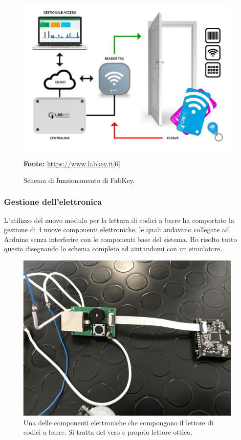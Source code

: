 \begin{figure}[H]
	\begin{center}
	\includegraphics[scale=0.4]{immagini/schema_labkey.jpg}
	\caption{Schema di funzionamento di FabKey.}
	\small{\textbf{Fonte:} \url{https://www.labkey.it}[6]}
	\end{center}
\end{figure}

\subsubsection{Gestione dell'elettronica}
L'utilizzo del nuovo modulo per la lettura di codici a barre ha comportato la gestione di 4 nuove componenti elettroniche, le quali andavano collegate ad Arduino senza interferire con le componenti base del sistema.
Ho risolto tutto questo disegnando lo schema completo ed aiutandomi con un simulatore.

\begin{figure}[H]
	\begin{center}
	\includegraphics[scale=0.065]{immagini/lettore_barcode.jpg}
	\caption{Una delle componenti elettroniche che compongono il lettore di codici a barre. Si tratta del vero e proprio lettore ottico.}
	\end{center}
\end{figure}

